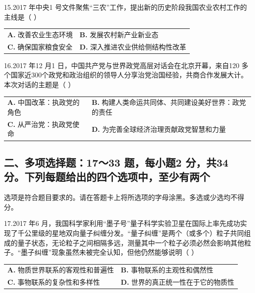 \documentclass[UTF8,11pt]{ctexart}
\begin{document}
15.2017 年中央1 号文件聚焦“三农”工作，提出新的历史阶段我国农业农村工作的主线是（  ）


\begin{center}\begin{tabular}{>{\raggedright\arraybackslash}p{\dimexpr(\linewidth-4\tabcolsep)/2\relax}>{\raggedright\arraybackslash}p{\dimexpr(\linewidth-4\tabcolsep)/2\relax}}
\textbf{A.} 改善农业生态环境 & \textbf{B.} 发展农村新产业新业态\\[.35em]
\textbf{C.} 确保国家粮食安全 & \textbf{D.} 深入推进农业供给侧结构性改革\\[.35em]\end{tabular}\end{center}

16.2017 年12 月1 日，中国共产党与世界政党高层对话会在北京开幕，来自120 多个国家近300个政党和政治组织的领导人分享治党治国经验，共商合作发展大计。本次对话的主题是（  ）


\begin{center}\begin{tabular}{>{\raggedright\arraybackslash}p{\dimexpr(\linewidth-4\tabcolsep)/2\relax}>{\raggedright\arraybackslash}p{\dimexpr(\linewidth-4\tabcolsep)/2\relax}}
\textbf{A.} 中国改革：执政党的角色 & \textbf{B.} 构建人类命运共同体、共同建设美好世界：政党的责任\\[.35em]
\textbf{C.} 从严治党：执政党使命 & \textbf{D.} 为完善全球经济治理贡献政党智慧和力量\\[.35em]\end{tabular}\end{center}

\subsection*{二、多项选择题：17～33 题，每小题2 分，共34 分。下列每题给出的四个选项中，至少有两个}

选项是符合题目要求的。请在答题卡上将所选项的字母涂黑。多选或少选均不得分。


17.2017 年6 月，我国科学家利用“墨子号”量子科学实验卫星在国际上率先成功实现了千公里级的星地双向量子纠缠分发。“量子纠缠”是两个（或多个）粒子共同组成的量子状态，无论粒子之间相隔多远，测量其中一个粒子必须必然会影响其他粒子。“墨子纠缠”现象虽然未被完全认知，但他仍然能够说明（      ）


\begin{center}\begin{tabular}{>{\raggedright\arraybackslash}p{\dimexpr(\linewidth-4\tabcolsep)/2\relax}>{\raggedright\arraybackslash}p{\dimexpr(\linewidth-4\tabcolsep)/2\relax}}
\textbf{A.} 物质世界联系的客观性和普遍性 & \textbf{B.} 事物联系的主观性和偶然性\\[.35em]
\textbf{C.} 事物联系的复杂性和多样性 & \textbf{D.} 世界的真正统一性在于它的物质性\\[.35em]\end{tabular}\end{center}
\end{document}
